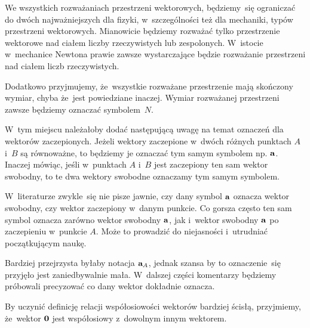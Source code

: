 \documentclass[a4paper,11pt]{article}
\begin{document}




We wszystkich rozważaniach przestrzeni wektorowych, będziemy~się ograniczać
do dwóch najważniejszych dla fizyki, w~szczególności też dla mechaniki,
typów przestrzeni wektorowych. Mianowicie będziemy rozważać tylko
przestrzenie wektorowe nad ciałem liczby rzeczywistych lub zespolonych.
W~istocie w~mechanice Newtona prawie zawsze wystarczające będzie rozważanie
przestrzeni nad ciałem liczb rzeczywistych.

Dodatkowo przyjmujemy, że~wszystkie rozważane przestrzenie mają skończony
wymiar, chyba że~jest powiedziane inaczej. Wymiar rozważanej przestrzeni
zawsze będziemy oznaczać symbolem~$N$.







 W~tym miejscu należałoby dodać następującą uwagę na temat oznaczeń
dla wektorów zaczepionych. Jeżeli wektory zaczepione w~dwóch różnych
punktach $A$ i~$B$ są równoważne, to będziemy je oznaczać tym samym symbolem
np. $\mathbf{a}$. Inaczej mówiąc, jeśli w~punktach $A$ i~$B$ jest zaczepiony
ten sam wektor swobodny, to te dwa wektory swobodne oznaczamy tym samym
symbolem.

W~literaturze zwykle~się nie pisze jawnie, czy dany symbol $\mathbf{a}$
oznacza wektor swobodny, czy wektor zaczepiony w~danym punkcie. Co gorsza
często ten sam symbol oznacza zarówno wektor swobodny $\mathbf{a}$, jak
i~wektor swobodny $\mathbf{a}$ po zaczepieniu w~punkcie $A$. Może to
prowadzić do niejasności i~utrudniać początkującym naukę.

Bardziej przejrzysta byłaby notacja $\mathbf{a}_{ A }$, jednak szansa by to
oznaczenie~się przyjęło jest zaniedbywalnie mała. W~dalszej części
komentarzy będziemy próbowali precyzować co dany wektor dokładnie oznacza.

\vspace{\spaceFour}



 By uczynić definicję relacji współosiowości wektorów bardziej
ścisłą, przyjmiemy, że~wektor $\mathbf{0}$ jest współosiowy z~dowolnym
innym wektorem.

\vspace{\spaceFour}
\end{document}
